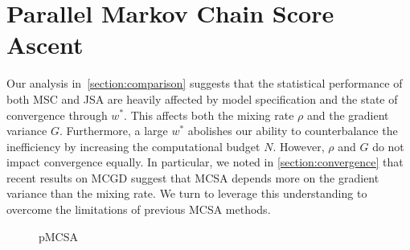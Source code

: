 
\section{Parallel Markov Chain Score Ascent}\label{section:pmcsa}
Our analysis in~\cref{section:comparison} suggests that the statistical performance of both MSC and JSA are heavily affected by model specification and the state of convergence through \(w^*\).
This affects both the mixing rate \(\rho\) and the gradient variance \(G\).
Furthermore, a large \(w^*\) abolishes our ability to counterbalance the inefficiency by increasing the computational budget \(N\).
However, \(\rho\) and \(G\) do not impact convergence equally.
In particular, we noted in \cref{section:convergence} that recent results on MCGD suggest that MCSA depends more on the gradient variance than the mixing rate.
We turn to leverage this understanding to overcome the limitations of previous MCSA methods.

\begin{wrapfigure}[12]{r}{0.43\textwidth}
\vspace{-6ex}
\begin{minipage}[c]{0.43\textwidth}
  \begin{algorithm2e}[H]
    \DontPrintSemicolon
    \SetAlgoLined
    \caption{pMCSA}\label{alg:pmcsa}
  \end{algorithm2e}
\end{minipage}
\end{wrapfigure}
%
%
